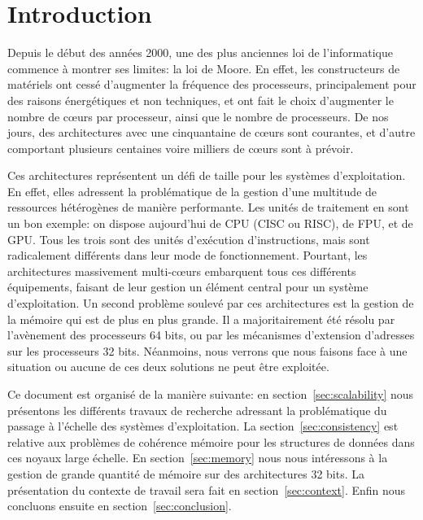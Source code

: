 \section{Introduction}

  \hspace{1cm}Depuis le début des années 2000, une des plus anciennes loi de
  l'informatique commence à montrer ses limites: la loi de Moore. En effet, les
  constructeurs de matériels ont cessé d'augmenter la fréquence des processeurs,
  principalement pour des raisons énergétiques et non techniques, et ont fait le
  choix d'augmenter le nombre de c\oe urs par processeur, ainsi que le nombre de
  processeurs. De nos jours, des architectures avec une cinquantaine de c\oe urs
  sont courantes, et d'autre comportant plusieurs centaines voire milliers de
  c\oe urs sont à prévoir.\newline
  
  \hspace{1cm}Ces architectures représentent un défi de taille pour les systèmes
  d'exploitation. En effet, elles adressent la problématique de la gestion d'une
  multitude de ressources hétérogènes de manière performante. Les unités de
  traitement en sont un bon exemple: on dispose aujourd'hui de CPU (CISC ou
  RISC), de FPU, et de GPU. Tous les trois sont des unités d'exécution
  d'instructions, mais sont radicalement différents dans leur mode de
  fonctionnement. Pourtant, les architectures massivement multi-c\oe urs
  embarquent tous ces différents équipements, faisant de leur gestion un élément
  central pour un système d'exploitation.  Un second problème soulevé par
  ces architectures est la gestion de la mémoire qui est de plus en plus grande. Il a
  majoritairement été résolu par l'avènement des processeurs 64 bits, ou par les
  mécanismes d'extension d'adresses sur les processeurs 32 bits. Néanmoins, nous verrons que nous faisons face à une situation ou aucune de ces deux solutions ne peut être exploitée.\newline

  \hspace{1cm}Ce document est organisé de la manière suivante: en
  section~\ref{sec:scalability} nous présentons les différents travaux de
  recherche adressant la problématique du passage à l'échelle des systèmes
  d'exploitation. La section~\ref{sec:consistency} est relative aux problèmes de
  cohérence mémoire pour les structures de données dans ces noyaux large
  échelle. En section~\ref{sec:memory} nous nous intéressons à la gestion de
  grande quantité de mémoire sur des architectures 32 bits. La présentation du
  contexte de travail sera fait en section~\ref{sec:context}. Enfin nous
  concluons ensuite en section~\ref{sec:conclusion}.
